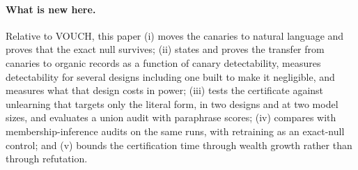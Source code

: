 \paragraph{What is new here.} Relative to VOUCH, this paper (i) moves the canaries to
natural language and proves that the exact null survives; (ii) states and proves the
transfer from canaries to organic records as a function of canary detectability, measures
detectability for several designs including one built to make it negligible, and measures
what that design costs in power; (iii) tests the certificate against unlearning that
targets only the literal form, in two designs and at two model sizes, and evaluates a union
audit with paraphrase scores; (iv) compares with membership-inference audits on the same
runs, with retraining as an exact-null control; and (v) bounds the certification time
through wealth growth rather than through refutation.
